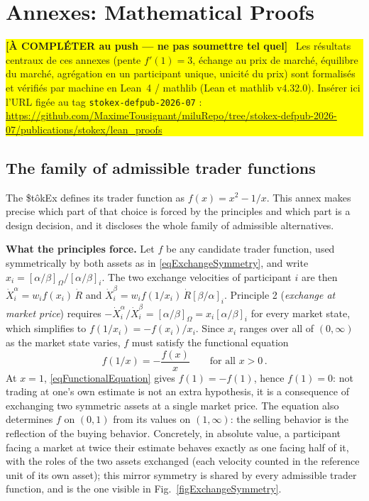 \documentclass[letterpaper]{article}
\newcommand{\priceAB}{\left[\alpha / \beta\right]}
\newcommand{\priceBA}{\left[\beta / \alpha\right]}
\newcommand{\StokEx}{\$t\^{o}kEx}
\newcommand{\placeholder}[1]{%
  \par\smallskip\noindent
  \colorbox{yellow}{\parbox{\dimexpr\linewidth-2\fboxsep\relax}{#1}}%
  \par\smallskip}
\begin{document}
\clearpage
\section{Annexes: Mathematical Proofs}

\placeholder{\textbf{[À COMPLÉTER au push --- ne pas soumettre tel quel]}~ Les
résultats centraux de ces annexes (pente $f'(1)=3$, échange au prix de marché,
équilibre du marché, agrégation en un participant unique, unicité du prix) sont
formalisés et vérifiés par machine en Lean~4 / mathlib (Lean et mathlib
v4.32.0). Insérer ici l'URL figée au tag \texttt{stokex-defpub-2026-07} :
\url{https://github.com/MaximeTousignant/miluRepo/tree/stokex-defpub-2026-07/publications/stokex/lean_proofs}}

\subsection{The family of admissible trader functions}\label{secTraderFamily}

The \StokEx{} defines its trader function as $f(x) = x^2 - 1/x$. This annex makes precise which part of that choice is forced by the principles and which part is a design decision, and it discloses the whole family of admissible alternatives.

\textbf{What the principles force.} Let $f$ be any candidate trader function, used symmetrically by both assets as in \eqref{eqExchangeSymmetry}, and write $x_i = \priceAB_\Omega / \priceAB_i$. The two exchange velocities of participant $i$ are then $\dot{X}^\alpha_i = w_i f(x_i)\, \dot{R}$ and $\dot{X}^\beta_i = w_i f(1/x_i)\, \dot{R} \priceBA_i$. Principle 2 (\emph{exchange at market price}) requires $-\dot{X}^\alpha_i / \dot{X}^\beta_i = \priceAB_\Omega = x_i \priceAB_i$ for every market state, which simplifies to $f(1/x_i) = -f(x_i)/x_i$. Since $x_i$ ranges over all of $(0,\infty)$ as the market state varies, $f$ must satisfy the functional equation
\begin{equation}
    f(1/x) = -\frac{f(x)}{x} \qquad \text{for all } x > 0\,. \label{eqFunctionalEquation}
\end{equation}
At $x = 1$, \eqref{eqFunctionalEquation} gives $f(1) = -f(1)$, hence $f(1) = 0$: not trading at one's own estimate is not an extra hypothesis, it is a consequence of exchanging two symmetric assets at a single market price. The equation also determines $f$ on $(0,1)$ from its values on $(1,\infty)$: the selling behavior is the reflection of the buying behavior. Concretely, in absolute value, a participant facing a market at twice their estimate behaves exactly as one facing half of it, with the roles of the two assets exchanged (each velocity counted in the reference unit of its own asset); this mirror symmetry is shared by every admissible trader function, and is the one visible in Fig.~\ref{figExchangeSymmetry}.
\end{document}
